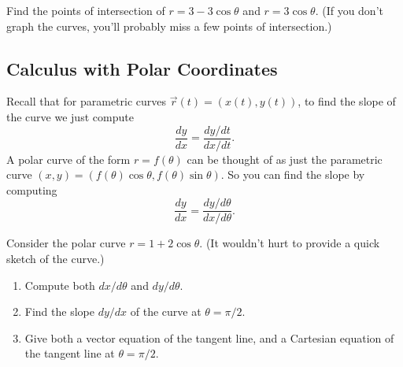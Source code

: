 \begin{problem}
Find the points of intersection of $r=3-3\cos\theta$ and $r=3\cos\theta$. (If you don't graph the curves, you'll probably miss a few points of intersection.)
\end{problem}



\subsection{Calculus with Polar Coordinates}

Recall that for parametric curves $\vec r(t) = (x(t),y(t))$, to find the slope of the curve we just compute $$\frac{dy}{dx}=\frac{dy/dt}{dx/dt}.$$ A polar curve of the form $r=f(\theta)$ can be thought of as just the parametric curve $(x,y) = (f(\theta)\cos\theta,f(\theta)\sin\theta)$. So you can find the slope by computing
$$\frac{dy}{dx}=\frac{dy/d\theta}{dx/d\theta}.$$

\begin{problem}
Consider the polar curve $r=1+2\cos \theta$. (It wouldn't hurt to provide a quick sketch of the curve.)
\begin{enumerate}
\item Compute both $dx/d\theta$ and $dy/d\theta$.
\item Find the slope $dy/dx$ of the curve at $\theta=\pi/2$.
\item Give both a vector equation of the tangent line, and a Cartesian equation of the tangent line at $\theta=\pi/2$.
\end{enumerate}
\end{problem}

